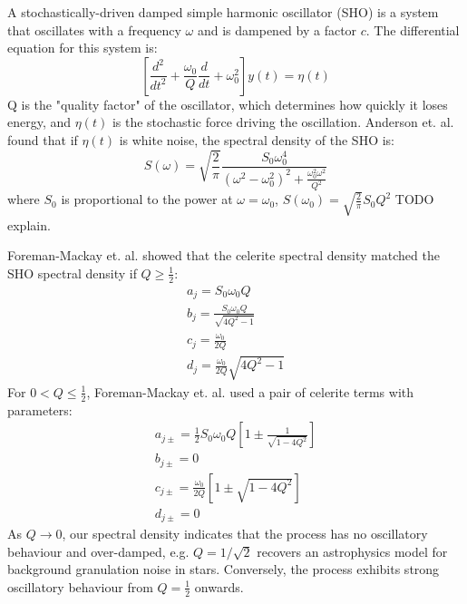 A stochastically-driven damped simple harmonic oscillator (SHO) is a system that oscillates with a frequency $\omega$ and is dampened by a factor $c$. The differential equation for this system is:
\begin{equation*}
    \left[ \frac{d^2}{dt^2} + \frac{\omega_0}{Q} \frac{d}{dt} + \omega_0^2 \right] y(t) = \eta(t)
\end{equation*}
Q is the "quality factor" of the oscillator, which determines how quickly it loses energy, and $\eta(t)$ is the stochastic force driving the oscillation. Anderson et. al. \cite{sho-spectral-density} found that if $\eta(t)$ is white noise, the spectral density of the SHO is:
\begin{equation*}
    S(\omega) = \sqrt{\frac{2}{\pi}} \frac{S_0 \omega_0^4}{(\omega^2 - \omega_0^2)^2 + \frac{\omega_0^2 \omega^2}{Q^2}}
\end{equation*}
where $S_0$ is proportional to the power at $\omega = \omega_0$, $S(\omega_0) = \sqrt{\frac{2}{\pi}} S_0 Q^2$ TODO explain.

Foreman-Mackay et. al. \cite{foreman-mackay} showed that the celerite spectral density matched the SHO spectral density if $Q \geq \frac{1}{2}$:
\begin{equation*}
    \begin{aligned}
        a_j = S_0 \omega_0 Q \\
        b_j = \frac{S_0 \omega_0 Q}{\sqrt{4Q^2 - 1}} \\
        c_j = \frac{\omega_0}{2Q} \\
        d_j = \frac{\omega_0}{2Q} \sqrt{4Q^2 - 1}
    \end{aligned}
\end{equation*}
For $0 < Q \leq \frac{1}{2}$, Foreman-Mackay et. al. \cite{foreman-mackay} used a pair of celerite terms with parameters:
\begin{equation*}
    \begin{aligned}
        a_{j \pm} = \frac{1}{2} S_0 \omega_0 Q \left[ 1 \pm \frac{1}{\sqrt{1 - 4Q^2}} \right] \\
        b_{j \pm} = 0 \\
        c_{j \pm} = \frac{\omega_0}{2Q} \left[ 1 \pm \sqrt{1 - 4Q^2} \right] \\
        d_{j \pm} = 0
    \end{aligned}
\end{equation*}
As $Q \to 0$, our spectral density indicates that the process has no oscillatory behaviour and over-damped, e.g. $Q = 1 / \sqrt{2}$ recovers an astrophysics model \cite{sho-noise-astro} for background granulation noise in stars. Conversely, the process exhibits strong oscillatory behaviour from $Q = \frac{1}{2}$ onwards.

